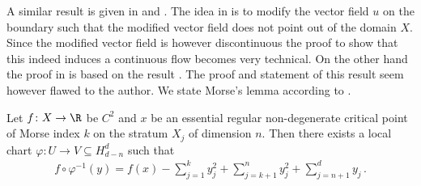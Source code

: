 A similar result is given in \cite[Theorem 7]{Handron2002} and \cite{Agrach1991}.
The idea in \cite{Handron2002} is to modify the vector field $u$ on the boundary such that
the modified vector field does not point out of the domain $X$.
Since the modified vector field is however discontinuous the proof to show that this indeed induces a continuous flow becomes very technical.
On the other hand the proof in \cite{Agrach1991} is based on the result \cite[Theorem 2.1]{Agrach1991}.
The proof and statement of this result seem however flawed to the author.
% 
% 
% 
We state Morse's lemma according to \cite[Lemma 5]{Handron2002}.
\begin{proposition}\label{pr:Morse_lemma}
  Let $f\colon X\to\R$ be $C^{2}$ and $x$ be an essential regular non-degenerate
  critical point of Morse index $k$ on the stratum $X_j$ of dimension $n$. Then there exists a
  local chart $\varphi\colon U\to V\subseteq H_{d-n}^d$ such that
  \begin{align}
    f\circ\varphi^{-1}(y)=f(x)-\sum_{j=1}^ky_j^2+\sum_{j=k+1}^ny_j^2+\sum_{j=n+1}^dy_j\,.
    \label{eq:Morse_MorseLemma}
  \end{align}
\end{proposition}
